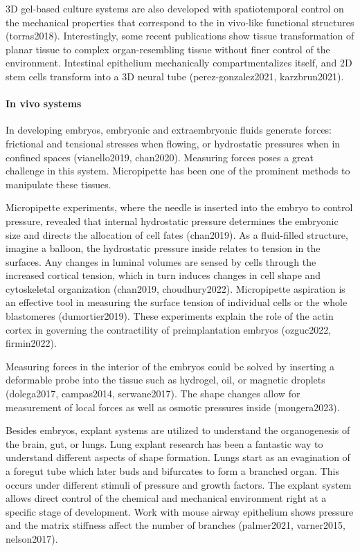 \documentclass[
]{article}
\begin{document}
3D gel-based culture systems are also developed with spatiotemporal
control on the mechanical properties that correspond to the in vivo-like
functional structures (torras2018). Interestingly, some recent
publications show tissue transformation of planar tissue to complex
organ-resembling tissue without finer control of the environment.
Intestinal epithelium mechanically compartmentalizes itself, and 2D stem
cells transform into a 3D neural tube (perez-gonzalez2021,
karzbrun2021).

\hypertarget{in-vivo-systems}{%
\paragraph{In vivo systems}\label{in-vivo-systems}}

In developing embryos, embryonic and extraembryonic fluids generate
forces: frictional and tensional stresses when flowing, or hydrostatic
pressures when in confined spaces (vianello2019, chan2020). Measuring
forces poses a great challenge in this system. Micropipette has been one
of the prominent methods to manipulate these tissues.

Micropipette experiments, where the needle is inserted into the embryo
to control pressure, revealed that internal hydrostatic pressure
determines the embryonic size and directs the allocation of cell fates
(chan2019). As a fluid-filled structure, imagine a balloon, the
hydrostatic pressure inside relates to tension in the surfaces. Any
changes in luminal volumes are sensed by cells through the increased
cortical tension, which in turn induces changes in cell shape and
cytoskeletal organization (chan2019, choudhury2022). Micropipette
aspiration is an effective tool in measuring the surface tension of
individual cells or the whole blastomeres (dumortier2019). These
experiments explain the role of the actin cortex in governing the
contractility of preimplantation embryos (ozguc2022, firmin2022).

Measuring forces in the interior of the embryos could be solved by
inserting a deformable probe into the tissue such as hydrogel, oil, or
magnetic droplets (dolega2017, campas2014, serwane2017). The shape
changes allow for measurement of local forces as well as osmotic
pressures inside (mongera2023).

Besides embryos, explant systems are utilized to understand the
organogenesis of the brain, gut, or lungs. Lung explant research has
been a fantastic way to understand different aspects of shape formation.
Lungs start as an evagination of a foregut tube which later buds and
bifurcates to form a branched organ. This occurs under different stimuli
of pressure and growth factors. The explant system allows direct control
of the chemical and mechanical environment right at a specific stage of
development. Work with mouse airway epithelium shows pressure and the
matrix stiffness affect the number of branches (palmer2021, varner2015,
nelson2017).
\end{document}
